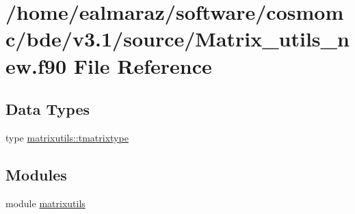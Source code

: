 \hypertarget{Matrix__utils__new_8f90}{}\section{/home/ealmaraz/software/cosmomc/bde/v3.1/source/\+Matrix\+\_\+utils\+\_\+new.f90 File Reference}
\label{Matrix__utils__new_8f90}
\subsection*{Data Types}
\begin{DoxyCompactItemize}
\item 
type \mbox{\hyperlink{structmatrixutils_1_1tmatrixtype}{matrixutils\+::tmatrixtype}}
\end{DoxyCompactItemize}
\subsection*{Modules}
\begin{DoxyCompactItemize}
\item 
module \mbox{\hyperlink{namespacematrixutils}{matrixutils}}
\end{DoxyCompactItemize}
